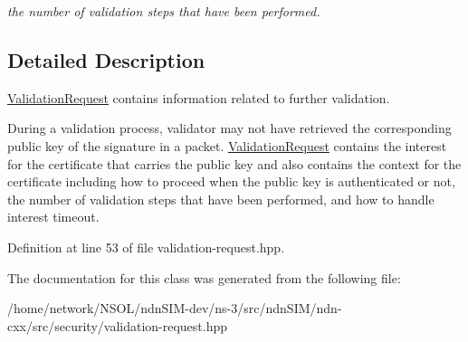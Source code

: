 \begin{DoxyCompactItemize}
\begin{DoxyCompactList}\small\item\em the number of validation steps that have been performed. \end{DoxyCompactList}\end{DoxyCompactItemize}


\subsection{Detailed Description}
\hyperlink{classndn_1_1ValidationRequest}{Validation\+Request} contains information related to further validation. 

During a validation process, validator may not have retrieved the corresponding public key of the signature in a packet. \hyperlink{classndn_1_1ValidationRequest}{Validation\+Request} contains the interest for the certificate that carries the public key and also contains the context for the certificate including how to proceed when the public key is authenticated or not, the number of validation steps that have been performed, and how to handle interest timeout. 

Definition at line 53 of file validation-\/request.\+hpp.



The documentation for this class was generated from the following file\+:\begin{DoxyCompactItemize}
\item 
/home/network/\+N\+S\+O\+L/ndn\+S\+I\+M-\/dev/ns-\/3/src/ndn\+S\+I\+M/ndn-\/cxx/src/security/validation-\/request.\+hpp\end{DoxyCompactItemize}
